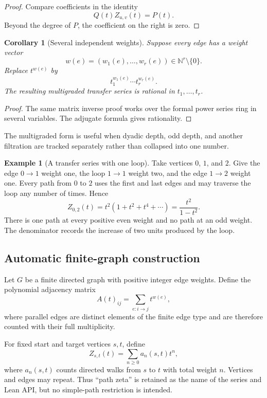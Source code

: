 \documentclass[11pt,a4paper]{article}
\newtheorem{corollary}[corollary]{Corollary}
\theoremstyle{definition}
\newtheorem{example}[example]{Example}
\theoremstyle{remark}
\theoremstyle{definition}\newtheorem{construction}[theorem]{Construction}\newtheorem{certificate}[theorem]{Numerical Certificate}
\theoremstyle{remark}\newtheorem{boundary}[theorem]{Boundary}
\begin{document}
\begin{proof}
Compare coefficients in the identity
\[
Q(t)Z_{u,v}(t)=P(t).
\]
Beyond the degree of $P$, the coefficient on the right is zero.
\end{proof}

\begin{corollary}[Several independent weights]\label{cor:multigraded_series}
Suppose every edge has a weight vector
\[
w(e)=(w_1(e),\ldots,w_r(e))\in\mathbb N^r\setminus\{0\}.
\]
Replace $t^{w(e)}$ by
\[
t_1^{w_1(e)}\cdots t_r^{w_r(e)}.
\]
The resulting multigraded transfer series is rational in $t_1,\ldots,t_r$.
\end{corollary}

\begin{proof}
The same matrix inverse proof works over the formal power series ring in several variables.  The adjugate formula gives rationality.
\end{proof}

The multigraded form is useful when dyadic depth, odd depth, and another filtration are tracked separately rather than collapsed into one number.

\begin{example}[A transfer series with one loop]\label{ex:simple_transfer_series}
Take vertices $0$, $1$, and $2$.  Give the edge $0\to1$ weight one, the loop $1\to1$ weight two, and the edge $1\to2$ weight one.  Every path from $0$ to $2$ uses the first and last edges and may traverse the loop any number of times.  Hence
\[
Z_{0,2}(t)
=
t^2(1+t^2+t^4+\cdots)
=
\frac{t^2}{1-t^2}.
\]
There is one path at every positive even weight and no path at an odd weight.  The denominator records the increase of two units produced by the loop.
\end{example}

\subsection{Automatic finite-graph construction}

Let $G$ be a finite directed graph with positive integer edge weights. Define the polynomial adjacency matrix
\[
A(t)_{ij}
=
\sum_{e:i\to j}t^{w(e)},
\]
where parallel edges are distinct elements of the finite edge type and are
therefore counted with their full multiplicity.

For fixed start and target vertices $s,t$, define
\[
Z_{s,t}(t)
=
\sum_{n\ge0}a_n(s,t)t^n,
\]
where $a_n(s,t)$ counts directed walks from $s$ to $t$ with total weight $n$.
Vertices and edges may repeat. Thus ``path zeta'' is retained as the name of
the series and Lean API, but no simple-path restriction is intended.
\end{document}
